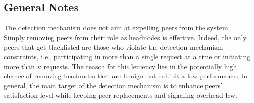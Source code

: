 \subsection{General Notes}
The detection mechanism does not aim at expelling peers from the system. Simply  removing peers from their role as headnodes is effective.
Indeed, the only peers that get blacklisted are those who violate the detection mechanism constraints, i.e., participating in more than a single request at a time or initiating more than $\kappa$ requests.
The reason for this leniency lies in the potentially high chance of removing headnodes that are benign but exhibit a low performance. 
In general, the main target of the detection mechanism is to enhance peers' satisfaction level while keeping peer replacements and signaling overhead low. 






